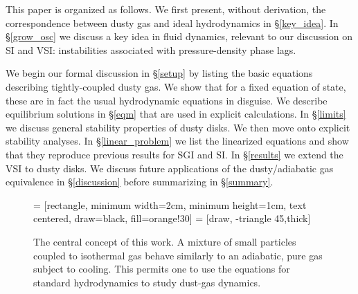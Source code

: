 \documentclass[iop, numberedappendix]{emulateapj}
\begin{document}
This paper is organized as follows. We first present, without
derivation, the correspondence between dusty gas and     
ideal hydrodynamics in \S\ref{key_idea}. In \S\ref{grow_osc} 
we discuss a key idea in fluid dynamics, relevant to our 
discussion on  SI and VSI: instabilities associated with
pressure-density phase lags.   

We begin our formal discussion in \S\ref{setup} by listing the 
basic equations describing tightly-coupled dusty gas. We show that for a
fixed equation of state, these are in 
fact the usual hydrodynamic equations in disguise. 
We describe equilibrium solutions in \S\ref{eqm} that are used in
explicit calculations. In \S\ref{limits} we discuss 
general stability properties of dusty disks. We then move onto
explicit stability analyses. In  
\S\ref{linear_problem} we list the linearized equations and show that 
they reproduce previous results for SGI and SI. In \S\ref{results} we
extend the VSI to dusty disks. We   
discuss future applications of the dusty/adiabatic gas equivalence in 
\S\ref{discussion} before summarizing in \S\ref{summary}. 


\begin{figure}
 = [rectangle, minimum width=2cm, minimum height=1cm, text centered, draw=black, fill=orange!30]
   = [draw, -triangle 45,thick]  
  \begin{center}
 \end{center}
\caption{The central concept of this work. A mixture of small particles
  coupled to isothermal gas behave similarly to an adiabatic, pure gas
  subject to cooling.  This
  permits one to use the equations for standard hydrodynamics to study
  dust-gas dynamics. \label{concept_chart}}
\end{figure}
\end{document}
